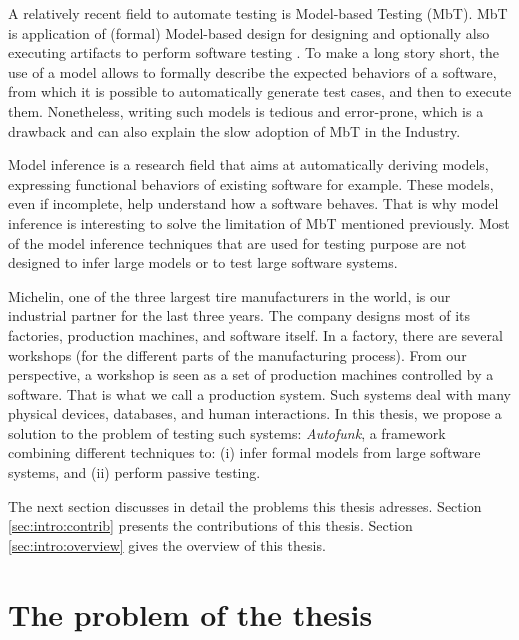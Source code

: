 A relatively recent field to automate testing is Model-based
Testing (MbT). MbT is application of (formal) Model-based design
for designing and optionally also executing artifacts to perform
software testing \cite{Jorgensen:1995:STC:526521}. To make a long
story short, the use of a model allows to formally describe the
expected behaviors of a software, from which it is possible to
automatically generate test cases, and then to execute them.
Nonetheless, writing such models is tedious and error-prone,
which is a drawback and can also explain the slow adoption of MbT
in the Industry.

Model inference is a research field that aims at automatically
deriving models, expressing functional behaviors of existing
software for example. These models, even if incomplete, help
understand how a software behaves. That is why model inference is
interesting to solve the limitation of MbT mentioned previously.
Most of the model inference techniques that are used for testing
purpose are not designed to infer large models or to test large
software systems.

Michelin, one of the three largest tire manufacturers in the
world, is our industrial partner for the last three years. The
company designs most of its factories, production machines, and
software itself. In a factory, there are several workshops (for
the different parts of the manufacturing process). From our
perspective, a workshop is seen as a set of production machines
controlled by a software. That is what we call a production
system. Such systems deal with many physical devices, databases,
and human interactions. In this thesis, we propose a solution to
the problem of testing such systems: \textit{Autofunk}, a
framework combining different techniques to: (i) infer formal
models from large software systems, and (ii) perform passive
testing.

The next section discusses in detail the problems this thesis
adresses. Section \ref{sec:intro:contrib} presents the
contributions of this thesis. Section \ref{sec:intro:overview}
gives the overview of this thesis.


\section{The problem of the thesis}



